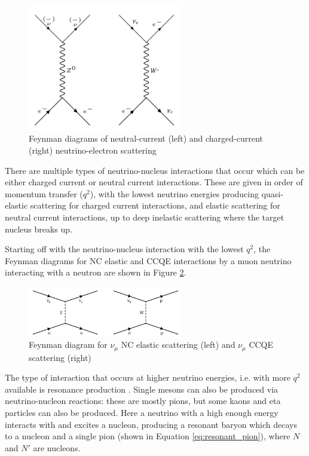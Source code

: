 \begin{figure}
    \centering
    \includegraphics[width=0.6\textwidth]{Figures/elastic_scattering.png}
    \caption{Feynman diagrams of neutral-current (left) and charged-current (right) neutrino-electron scattering}
    \label{fig:elastic_scattering}
\end{figure}

There are multiple types of neutrino-nucleus interactions that occur which can be either charged current or neutral current interactions. These are given in order of momentum transfer ($q^2$), with the lowest neutrino energies producing quasi-elastic scattering for charged current interactions, and elastic scattering for neutral current interactions, up to deep inelastic scattering where the target nucleus breaks up. 

Starting off with the neutrino-nucleus interaction with the lowest $q^2$, the Feynman diagrams for NC elastic and CCQE interactions by a muon neutrino interacting with a neutron are shown in Figure \ref{fig:ncel_ccqe}. 

\begin{figure}
    \centering
    \includegraphics[width=0.6\textwidth]{Figures/ncel_ccqe.png}
    \caption{Feynman diagram for $\nu_{\mu}$ NC elastic scattering (left) and $\nu_{\mu}$ CCQE scattering (right)}
    \label{fig:ncel_ccqe}
\end{figure}

The type of interaction that occurs at higher neutrino energies, i.e. with more $q^2$ available is resonance production \cite{PhysRevD.69.014013}. Single mesons can also be produced via neutrino-nucleon reactions: these are mostly pions, but some kaons and eta particles can also be produced. Here a neutrino with a high enough energy interacts with and excites a nucleon, producing a resonant baryon which decays to a nucleon and a single pion (shown in Equation \ref{eq:resonant_pion}), where $N$ and $N'$ are nucleons.


